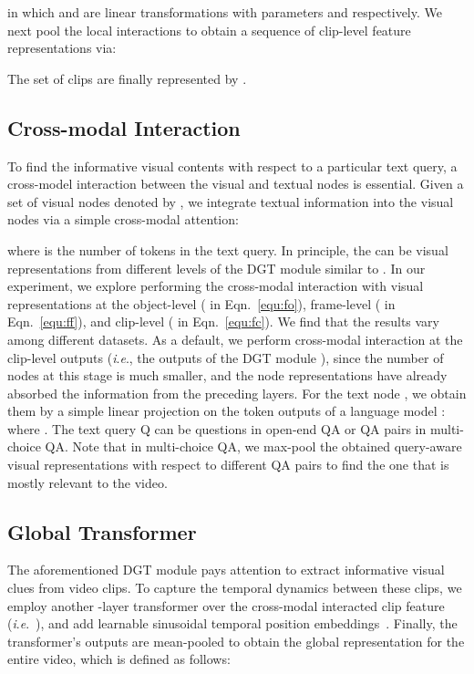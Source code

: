 \documentclass[runningheads]{llncs}
\newcommand{\ie}{\textit{i}.\textit{e}.}
\begin{document}
in which  and  are linear transformations with parameters  and  respectively.
We next pool the local interactions to obtain a sequence of clip-level feature representations via:

\noindent The set of  clips are finally represented by  . 

\subsection{Cross-modal Interaction}
\label{sec:cm}
To find the informative visual contents with respect to a particular text query, a cross-model interaction between the visual and textual nodes is essential. Given a set of visual nodes denoted by , we integrate textual information    into the visual nodes via a simple cross-modal attention:

where  is the number of tokens in the text query. 
In principle, the  can be visual representations from different levels of the DGT module similar to \cite{xiao2021video}. In our experiment, we explore performing the cross-modal interaction with visual representations at the object-level ( in Eqn.~\eqref{equ:fo}), frame-level ( in Eqn.~\eqref{equ:ff}), and  clip-level ( in Eqn.~\eqref{equ:fc}). We find that the results vary among different datasets. As a default, we perform cross-modal interaction at the clip-level outputs (\ie, the outputs of the DGT module ), since the number of nodes at this stage is much smaller, and the node representations have already absorbed the information from the preceding layers. For the text node , we obtain them by a simple linear projection on the token outputs of a language model \cite{devlin2018bert}: 
where . The text query Q can be questions in open-end QA or QA pairs in multi-choice QA. Note that in multi-choice QA, we max-pool the obtained query-aware visual representations with respect to different QA pairs to find the one that is mostly relevant to the video. 

\subsection{Global Transformer}
\label{sec:gt}
The aforementioned DGT module pays attention to extract informative visual clues from video clips. To capture the temporal dynamics between these clips, we employ another -layer transformer over the cross-modal interacted clip feature (\ie~), and add learnable sinusoidal temporal position embeddings~\cite{devlin2018bert}. Finally, the transformer's outputs are mean-pooled to obtain the global representation  for the entire video, which is defined as follows:
\end{document}
